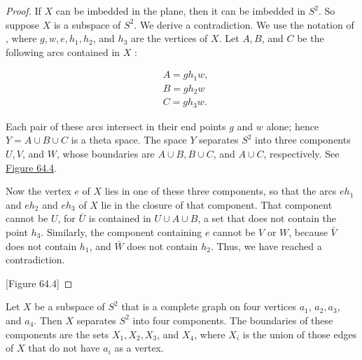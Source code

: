 \begin{proof}
If \(X\) can be imbedded in the plane, then it can be imbedded in \(S^{2}\). So suppose \(X\) is a subspace of \(S^{2}\). We derive a contradiction.
We use the notation of , where \(g,w,e,h_{1},h_{2}\), and \(h_{3}\) are the vertices of \(X\). Let \(A,B\), and \(C\) be the following arcs contained in \(X\) :

\[
\begin{aligned} & A = gh_{1}w, \\ & B = gh_{2}w \\ & C = gh_{3}w. \end{aligned}
\]

Each pair of these arcs intersect in their end points \(g\) and \(w\) alone; hence \(Y = A \cup B \cup C\) is a theta space. The space \(Y\) separates \(S^{2}\) into three components \(U,V\), and \(W\), whose boundaries are \(A \cup B,B \cup C\), and \(A \cup C\), respectively. See \hyperref[fig:64.4]{Figure 64.4}.

Now the vertex \(e\) of \(X\) lies in one of these three components, so that the arcs \(eh_{1}\) and \(eh_{2}\) and \(eh_{3}\) of \(X\) lie in the closure of that component. That component cannot be \(U\), for \(\bar{U}\) is contained in \(U \cup A \cup B\), a set that does not contain the point \(h_{3}\). Similarly, the component containing \(e\) cannot be \(V\) or \(W\), because \(\bar{V}\) does not contain \(h_{1}\), and \(\bar{W}\) does not contain \(h_{2}\). Thus, we have reached a contradiction.

[Figure 64.4]
\end{proof}
\begin{lemma}
\label{lem:\thetheorem}
Let \(X\) be a subspace of \(S^{2}\) that is a complete graph on four vertices \(a_{1}\), \(a_{2},a_{3}\), and \(a_{4}\). Then \(X\) separates \(S^{2}\) into four components. The boundaries of these components are the sets \(X_{1},X_{2},X_{3}\), and \(X_{4}\), where \(X_{i}\) is the union of those edges of \(X\) that do not have \(a_{i}\) as a vertex.
\end{lemma}

